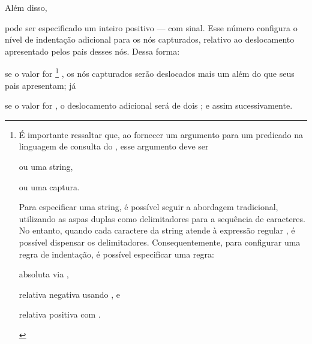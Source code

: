 \documentclass
  [11pt,a4paper,english,brazil,openright,sumario=tradicional,twoside]
  {abntex2}
\begin{document}
\begin{inparaenum}
          Além disso,
    \item pode ser especificado um inteiro positivo --- com sinal. Esse número
          configura o nível de indentação adicional para os nós capturados,
          relativo ao deslocamento apresentado pelos pais desses nós. Dessa
          forma:
          \begin{inparaenum}
            \item se o valor for %
                  \footnote
                    { É importante ressaltar que, ao fornecer um argumento para
                      um predicado na linguagem de consulta do \treesitter,
                      esse argumento deve ser
                      \begin{inparaenum}[(I)]
                        \item ou uma string,
                        \item ou uma captura.
                      \end{inparaenum}
                      Para especificar uma string, é possível seguir a
                      abordagem tradicional, utilizando as aspas duplas como
                      delimitadores para a sequência de caracteres. No entanto,
                      quando cada caractere da string atende à expressão
                      regular \usebox{\querystringregex}, é possível dispensar
                      os delimitadores. Consequentemente, para configurar uma
                      regra de indentação, é possível especificar uma regra:
                      \begin{inparaenum}[(I)]
                        \item absoluta via \usebox{\indentruleabs},
                        \item relativa negativa usando \usebox{\indentruleneg},
                              e
                        \item relativa positiva com \usebox{\indentrulepos}.
                      \end{inparaenum}}%
                  , os nós capturados
                  serão deslocados mais um 
                  além do que seus pais apresentam; já
            \item se o valor for , o deslocamento
                  adicional será de dois ; e
                  assim sucessivamente.
          \end{inparaenum}


\end{inparaenum}
\end{document}
